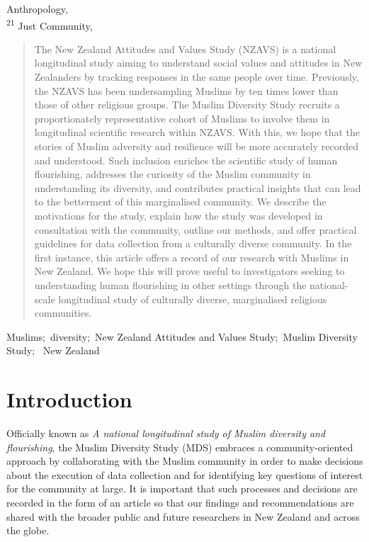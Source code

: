 \documentclass[
]{interact}
\begin{document}
Anthropology,  \\ \textsuperscript{21}  Just Community,  
\begin{abstract}
The New Zealand Attitudes and Values Study (NZAVS) is a national
longitudinal study aiming to understand social values and attitudes in
New Zealanders by tracking responses in the same people over time.
Previously, the NZAVS has been undersampling Muslims by ten times lower
than those of other religious groups. The Muslim Diversity Study
recruits a proportionately representative cohort of Muslims to involve
them in longitudinal scientific research within NZAVS. With this, we
hope that the stories of Muslim adversity and resilience will be more
accurately recorded and understood. Such inclusion enriches the
scientific study of human flourishing, addresses the curiosity of the
Muslim community in understanding its diversity, and contributes
practical insights that can lead to the betterment of this marginalised
community. We describe the motivations for the study, explain how the
study was developed in consultation with the community, outline our
methods, and offer practical guidelines for data collection from a
culturally diverse community. In the first instance, this article offers
a record of our research with Muslims in New Zealand. We hope this will
prove useful to investigators seeking to understanding human flourishing
in other settings through the national-scale longitudinal study of
culturally diverse, marginalised religious communities.
\end{abstract}
\begin{keywords}
\def\sep{;\ }
Muslims\sep diversity\sep New Zealand Attitudes and Values
Study\sep Muslim Diversity Study\sep 
New Zealand
\end{keywords}


\section{Introduction}\label{sec-intro}

Officially known as \emph{A national longitudinal study of Muslim
diversity and flourishing}, the Muslim Diversity Study (MDS) embraces a
community-oriented approach by collaborating with the Muslim community
in order to make decisions about the execution of data collection and
for identifying key questions of interest for the community at large. It
is important that such processes and decisions are recorded in the form
of an article so that our findings and recommendations are shared with
the broader public and future researchers in New Zealand and across the
globe.
\end{document}
